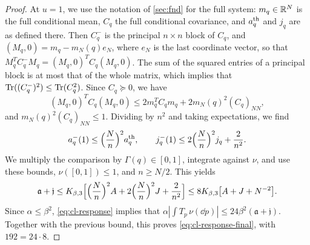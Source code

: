 \begin{proof}
At $u=1$, we use the notation of \cref{sec:fnd} for the full system:
$m_q\in\mathbb R^N$ is the full conditional mean, $C_q$ the full conditional
covariance, and $a_q^{\rm th}$ and $j_q$ are as defined there. Then
$C_q^-$ is the principal $n\times n$ block of $C_q$, and
$(M_q,0)=m_q-m_N(q)e_N$, where $e_N$ is the last coordinate vector, so
that $M_q^TC_q^-M_q=(M_q,0)^TC_q(M_q,0)$. The
sum of the squared entries of a principal block is at most that of the
whole matrix, which implies that $\operatorname{Tr}((C_q^-)^2)\le\operatorname{Tr}(C_q^2)$. Since $C_q\succeq0$, we
have
\[
 (M_q,0)^TC_q(M_q,0)\le2m_q^TC_qm_q+2m_N(q)^2(C_q)_{NN},
\]
and $m_N(q)^2(C_q)_{NN}\le1$. Dividing by $n^2$ and taking expectations,
we find
\[
 a_q^-(1)\le\Bigl(\frac Nn\Bigr)^2a_q^{\rm th},\qquad
 j_q^-(1)\le2\Bigl(\frac Nn\Bigr)^2j_q+\frac2{n^2}.
\]
We multiply the comparison by $\Gamma(q)\in[0,1]$, integrate against
$\nu$, and use these bounds, $\nu([0,1])\le1$, and $n\ge N/2$. This
yields
\[
 \mathfrak a+\mathfrak j
 \le K_{\beta,3}\Bigl[\Bigl(\frac Nn\Bigr)^2A+2\Bigl(\frac Nn\Bigr)^2J
 +\frac2{n^2}\Bigr]
 \le8K_{\beta,3}\bigl[A+J+N^{-2}\bigr].
\]
Since $\alpha\le\beta^2$, \eqref{eq:cl-response} implies that
$\alpha|\int T_p\,\nu(\dd p)|\le24\beta^2(\mathfrak a+\mathfrak j)$.
Together with the previous bound, this proves
\eqref{eq:cl-response-final}, with $192=24\cdot8$.
\end{proof}
